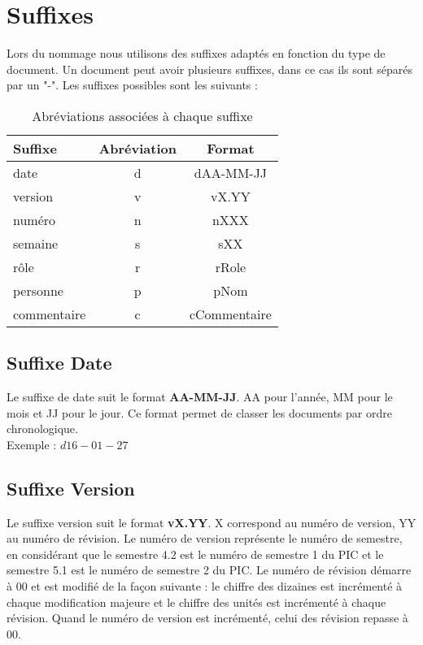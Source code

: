 \section{Suffixes}

Lors du nommage nous utilisons des suffixes adaptés en fonction du type de document. Un document peut avoir plusieurs suffixes, dans ce cas ils sont séparés par un "-". Les suffixes possibles sont les suivants : 

	\begin{table}[H]
		\centering
		\begin{tabularx}{10cm}{|X|c|c|}
		\hline
		\rowcolor[gray]{0.85} Suffixe & Abréviation & Format\\
		\hline
		date & d & dAA-MM-JJ\\
		\hline
		version & v & vX.YY\\
		\hline
		numéro & n & nXXX\\
		\hline
		semaine & s & sXX\\
		\hline
		rôle & r & rRole\\
		\hline
		personne & p & pNom\\
		\hline
		commentaire & c & cCommentaire\\
		\hline
		\end{tabularx}
	\caption{Abréviations associées à chaque suffixe}
	\label{Suffixes}
	\end{table}
	


\subsection{Suffixe Date}
\label{suffixe_date}

Le suffixe de date suit le format \textbf{AA-MM-JJ}. AA pour l'année, MM pour le mois et JJ pour le jour. Ce format permet de classer les documents par ordre chronologique.\\

Exemple : $d16-01-27$ 

\subsection{Suffixe Version}
\label{suffixe_version}

Le suffixe version suit le format \textbf{vX.YY}. X correspond au numéro de version, YY au numéro de révision. Le numéro de version représente le numéro de semestre, en considérant que le semestre 4.2 est le numéro de semestre 1 du PIC et le semestre 5.1 est le numéro de semestre 2 du PIC. Le numéro de révision démarre à 00 et est modifié de la façon suivante : le chiffre des dizaines est incrémenté à chaque modification majeure et le chiffre des unités est incrémenté à chaque révision. Quand le numéro de version est incrémenté, celui des révision repasse à 00.\\

